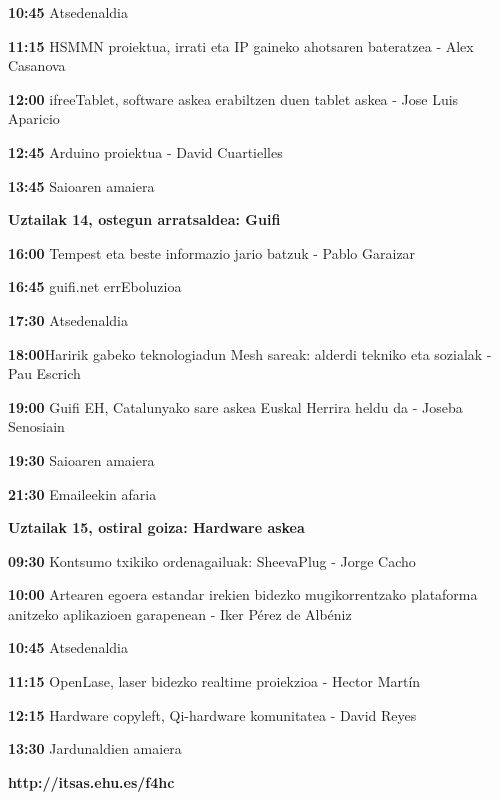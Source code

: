 \documentclass[a4paper,titlepage,11pt,oneside]{article}
\begin{document}
{\color{social}\textbf{10:45}} Atsedenaldia 

{\color{charla}\textbf{11:15}} HSMMN proiektua, irrati eta IP gaineko ahotsaren bateratzea - Alex Casanova

{\color{charla}\textbf{12:00}} ifreeTablet, software askea erabiltzen duen tablet askea - Jose Luis Aparicio

{\color{charla}\textbf{12:45}} Arduino proiektua - David Cuartielles

{\color{social}\textbf{13:45}} Saioaren amaiera

\Large
\textbf{{\color{claro}Uztailak 14, ostegun arratsaldea:} {\color{oscuro}Guifi}}

\normalsize
{\color{charla}\textbf{16:00}} Tempest eta beste informazio jario batzuk - Pablo Garaizar

{\color{charla}\textbf{16:45}} guifi.net errEboluzioa

{\color{social}\textbf{17:30}} Atsedenaldia 

{\color{charla}\textbf{18:00}}Haririk gabeko teknologiadun Mesh sareak: alderdi tekniko eta sozialak - Pau Escrich

{\color{charla}\textbf{19:00}} Guifi EH, Catalunyako sare askea Euskal Herrira heldu da - Joseba Senosiain

{\color{social}\textbf{19:30}} Saioaren amaiera

{\color{social}\textbf{21:30}} Emaileekin afaria

\Large
\textbf{{\color{claro}Uztailak 15, ostiral goiza:} {\color{oscuro}Hardware askea}}

\normalsize
{\color{charla}\textbf{09:30}} Kontsumo txikiko ordenagailuak: SheevaPlug - Jorge Cacho

{\color{charla}\textbf{10:00}} Artearen egoera estandar irekien bidezko mugikorrentzako plataforma anitzeko aplikazioen garapenean - Iker Pérez de Albéniz

{\color{social}\textbf{10:45}} Atsedenaldia 

{\color{charla}\textbf{11:15}} OpenLase, laser bidezko realtime proiekzioa - Hector Martín

{\color{charla}\textbf{12:15}} Hardware copyleft, Qi-hardware komunitatea - David Reyes

{\color{social}\textbf{13:30}} Jardunaldien amaiera 

\begin{center}
\Huge{\textbf{\color{oscuro}http://itsas.ehu.es/f4hc}}
\end{center}
\end{document}
